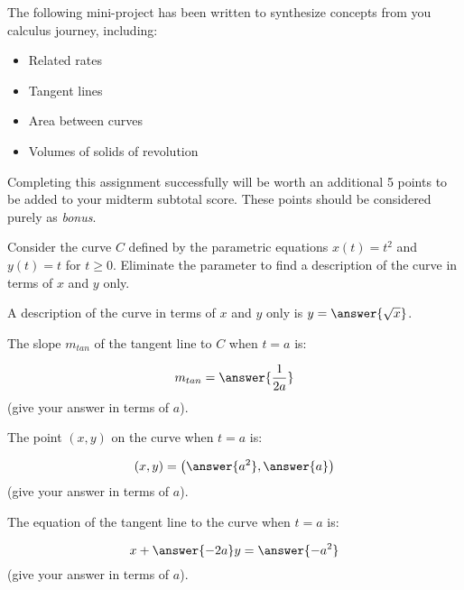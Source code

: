 \documentclass{ximera}
\author{Jim Talamo}
\begin{document}
\begin{exercise}
The following mini-project has been written to synthesize concepts from you calculus journey, including:

\begin{itemize}
\item Related rates
\item Tangent lines
\item Area between curves
\item Volumes of solids of revolution
\end{itemize}

Completing this assignment successfully will be worth an additional 5 points to be added to your midterm subtotal score.  These points should be considered purely as \emph{bonus}.

Consider the curve $C$ defined by the parametric equations $x(t) = t^2$ and $y(t) = t$ for $t \geq 0$.  Eliminate the parameter to find a description of the curve in terms of $x$ and $y$ only.

 A description of the curve in terms of $x$ and $y$ only is $y = \answer{\sqrt{x}}$.

\begin{exercise}
The slope $m_{tan}$ of the tangent line to $C$ when $t=a$ is:

\[
m_{tan} = \answer{\frac{1}{2a}}
\]
(give your answer in terms of $a$).

The point $(x,y)$ on the curve when $t=a$ is:

\[
(x,y) = \left(\answer{a^2},\answer{a}\right)
\]
(give your answer in terms of $a$).
\end{exercise}
 
 The equation of the tangent line to the curve when $t=a$ is:
 
 \[
x+ \answer{-2a}y= \answer{-a^2}
 \] 
 (give your answer in terms of $a$).
 
\end{exercise}
\end{document}
